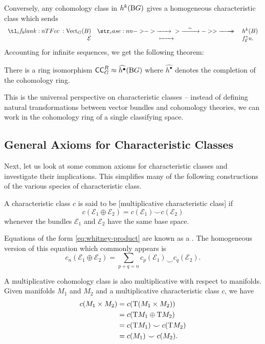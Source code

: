Conversely, any cohomology class in $h^k(\mathrm{B} G)$ gives a homogeneous characteristic class which sends
\[
	\lkxfunc{c}{\Vect_G(B)}{h^k(B)}{\mathcal{E}}{f_{\mathcal{E}}^*u.}
\]
Accounting for infinite sequences, we get the following theorem:

\begin{theorem}\label{thm:universal-characteristic-classes}
	There is a ring isomorphism $\mathsf{CC}^R_G\approx \widehat{h^\bullet}(\mathrm{B} G)$
	where $\widehat{h^\bullet}$ denotes the completion of the cohomology ring.
\end{theorem}

This is the universal perspective on characteristic classes -- instead of defining natural transformations between vector bundles and cohomology theories, we can work in the cohomology ring of a single classifying space.

\subsection{General Axioms for Characteristic Classes}

Next, let us look at some common axioms for characteristic classes and investigate their implications. This simplifies many of the following constructions of the various species of characteristic class.

\begin{definition}
	A characteristic class $c$ is said to be [multiplicative characteristic class] if \begin{equation}\label{eq:whitney-product}
		c(\mathcal{E}_1\oplus \mathcal{E}_2)=c(\mathcal{E}_1)\smile c(\mathcal{E}_2)
	\end{equation}
	whenever the bundles $\mathcal{E}_1$ and $\mathcal{E}_2$ have the same base space.
\end{definition}

Equations of the form \cref{eq:whitney-product} are known as a . The homogeneous version of this equation which commonly appears is
\[
	c_n(\mathcal{E}_1\oplus \mathcal{E}_2) = \sum_{p+q=n}c_p(\mathcal{E}_1)\smile c_q(\mathcal{E}_2).
\]

\begin{remark}
	A multiplicative cohomology class is also multiplicative with respect to manifolds. Given manifolds $M_1$ and $M_2$ and a multiplicative characteristic class $c$, we have
	\[
		\begin{aligned}
			c(M_1\times M_2) & = c(\mathrm{T}(M_1\times M_2))      \\
			                 & = c(\mathrm{T} M_1\oplus \mathrm{T} M_2)    \\
			                 & = c(\mathrm{T} M_1)\smile c(\mathrm{T} M_2) \\
			                 & = c(M_1)\smile c(M_2).
		\end{aligned}
	\]
\end{remark}

